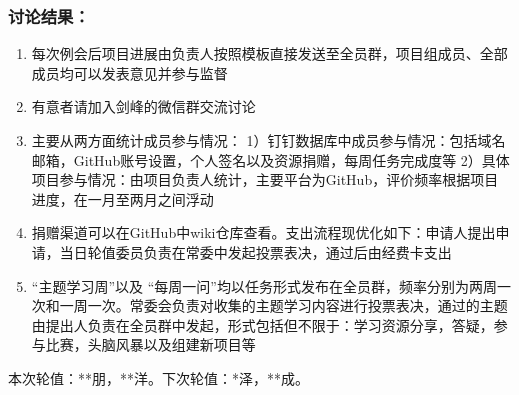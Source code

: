 \documentclass[]{article}
\providecommand{\tightlist}{%
  \setlength{\itemsep}{0pt}\setlength{\parskip}{0pt}}
\begin{document}
\subsubsection{讨论结果：}

\begin{enumerate}
\def\labelenumi{\arabic{enumi}.}
\tightlist
\item
  每次例会后项目进展由负责人按照模板直接发送至全员群，项目组成员、全部成员均可以发表意见并参与监督
\item
  有意者请加入剑峰的微信群交流讨论
\item
  主要从两方面统计成员参与情况：
  1）钉钉数据库中成员参与情况：包括域名邮箱，GitHub账号设置，个人签名以及资源捐赠，每周任务完成度等
  2）具体项目参与情况：由项目负责人统计，主要平台为GitHub，评价频率根据项目进度，在一月至两月之间浮动
\item
  捐赠渠道可以在GitHub中wiki仓库查看。支出流程现优化如下：申请人提出申请，当日轮值委员负责在常委中发起投票表决，通过后由经费卡支出
\item
  ``主题学习周''以及
  ``每周一问''均以任务形式发布在全员群，频率分别为两周一次和一周一次。常委会负责对收集的主题学习内容进行投票表决，通过的主题由提出人负责在全员群中发起，形式包括但不限于：学习资源分享，答疑，参与比赛，头脑风暴以及组建新项目等
\end{enumerate}

本次轮值：**朋，**洋。下次轮值：*泽，**成。
\end{document}
